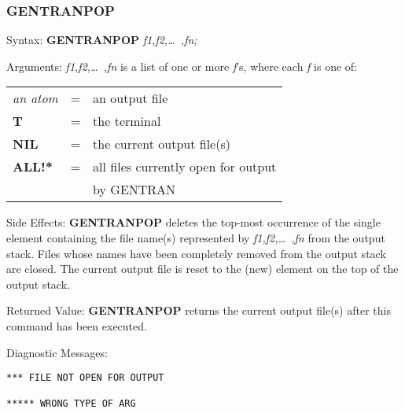\subsubsection{GENTRANPOP}
\begin{describe}{Syntax:}
{\bf GENTRANPOP} {\it f1,f2,\dots\ ,fn;}
\end{describe}
\begin{describe}{Arguments:}
{\it f1,f2,\dots\ ,fn\/} is a list of one or more {\it f\/}'s, where each
{\it f\/} is one of:
\begin{center}
\begin{tabular}{lll}
{\it an atom} & = & an output file\\
{\bf T} & = & the terminal\\
{\bf NIL} & = & the current output file(s)\\
{\bf ALL!*} & = & all files currently open for output \\
& & by GENTRAN\\
\end{tabular}
\end{center}
\end{describe}
\begin{describe}{Side Effects:}
{\bf GENTRANPOP} deletes the top-most occurrence of the single element
containing the file name(s) represented by {\it f1,f2,\dots\ ,fn\/}
from the output stack.  Files whose names have been completely removed from
the output stack are closed.  The current output file is reset to the
(new) element on the top of the output stack.
\end{describe}
\begin{describe}{Returned Value:}
{\bf GENTRANPOP} returns the current output file(s) after this command
has been executed.
\end{describe}
\begin{describe}{Diagnostic Messages:}
\begin{verbatim}
*** FILE NOT OPEN FOR OUTPUT

***** WRONG TYPE OF ARG
\end{verbatim}
\end{describe}
